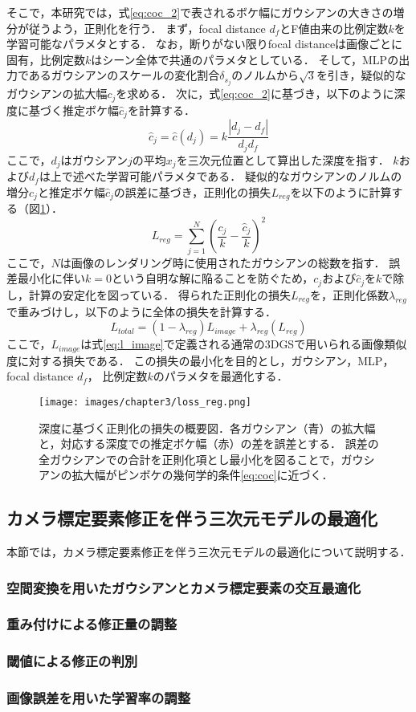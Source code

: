 そこで，本研究では，式\ref{eq:coc_2}で表されるボケ幅にガウシアンの大きさの増分が従うよう，正則化を行う．
まず，focal distance $d_f$とF値由来の比例定数$k$を学習可能なパラメタとする．
なお，断りがない限りfocal distanceは画像ごとに固有，比例定数$k$はシーン全体で共通のパラメタとしている．
そして，MLPの出力であるガウシアンのスケールの変化割合$\delta_{s_j}$のノルムから$\sqrt{3}$を引き，疑似的なガウシアンの拡大幅$c_j$を求める．
次に，式\ref{eq:coc_2}に基づき，以下のように深度に基づく推定ボケ幅$\hat{c}_j$を計算する．
\begin{equation}
	\hat{c}_j = \hat{c}(d_j) = k \frac{\left|d_j-d_f\right|}{d_jd_f}
	\label{eq:loss_reg}
\end{equation}
ここで，$d_j$はガウシアン$j$の平均$x_j$を三次元位置として算出した深度を指す．
$k$および$d_f$は上で述べた学習可能パラメタである．
疑似的なガウシアンのノルムの増分$c_j$と推定ボケ幅$\hat{c}_j$の誤差に基づき，正則化の損失$L_{reg}$を以下のように計算する（図\ref{fig:loss_reg}）．
\begin{equation}
	L_{reg}=\sum_{j=1}^N\left(\frac{c_j}{k}-\frac{\hat{c}_j}{k}\right)^2
	\label{eq:loss_reg}
\end{equation}
ここで，$N$は画像のレンダリング時に使用されたガウシアンの総数を指す．
誤差最小化に伴い$k=0$という自明な解に陥ることを防ぐため，$c_j$および$\hat{c}_j$を$k$で除し，計算の安定化を図っている．
得られた正則化の損失$L_{reg}$を，正則化係数$\lambda_{reg}$で重みづけし，以下のように全体の損失を計算する．
\begin{equation}
	L_{total} = (1-\lambda_{reg})L_{image} + \lambda_{reg}(L_{reg})
\end{equation}
ここで，$L_{image}$は式\ref{eq:l_image}で定義される通常の3DGSで用いられる画像類似度に対する損失である．
この損失の最小化を目的とし，ガウシアン，MLP，focal distance $d_f$， 比例定数$k$のパラメタを最適化する．
\begin{figure}[h]
	\centering
	\texttt{[image: images/chapter3/loss\_reg.png]}
	\caption[深度に基づく正則化の損失の概要図]{深度に基づく正則化の損失の概要図．各ガウシアン（青）の拡大幅と，対応する深度での推定ボケ幅（赤）の差を誤差とする．
	誤差の全ガウシアンでの合計を正則化項とし最小化を図ることで，ガウシアンの拡大幅がピンボケの幾何学的条件\ref{eq:coc}に近づく．}
	\label{fig:loss_reg}
\end{figure}

\subsection{カメラ標定要素修正を伴う三次元モデルの最適化}\label{subsec:pose_correction}
本節では，カメラ標定要素修正を伴う三次元モデルの最適化について説明する．

\subsubsection{空間変換を用いたガウシアンとカメラ標定要素の交互最適化}\label{subsubsec:sequential_optimization}
\subsubsection{重み付けによる修正量の調整}
\subsubsection*{閾値による修正の判別}
\subsubsection*{画像誤差を用いた学習率の調整}